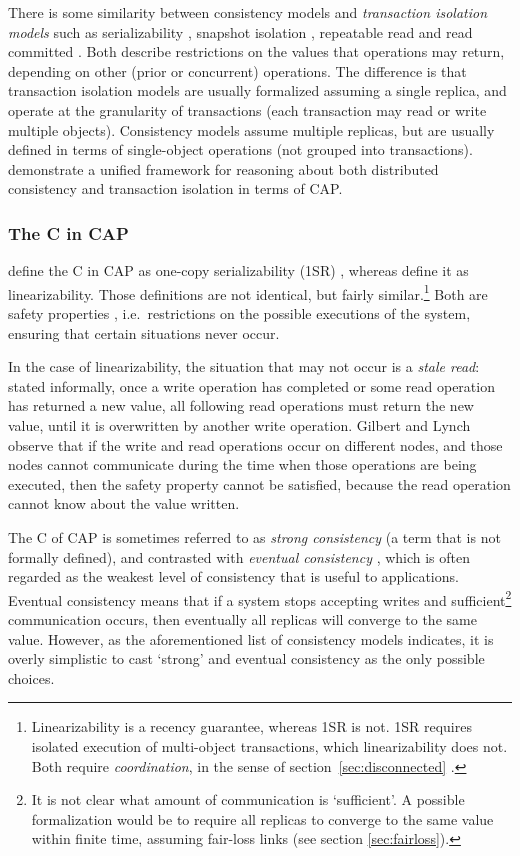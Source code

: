 \documentclass[fleqn,12pt,lineno]{wlpeerj} %
\begin{document}
There is some similarity between consistency models and \emph{transaction isolation models} such as
serializability \citep{Bernstein1987va}, snapshot isolation \citep{Berenson1995kj}, repeatable read
and read committed \citep{Adya1999tx,Gray1976us}. Both describe restrictions on the values that
operations may return, depending on other (prior or concurrent) operations. The difference is that
transaction isolation models are usually formalized assuming a single replica, and operate at the
granularity of transactions (each transaction may read or write multiple objects). Consistency
models assume multiple replicas, but are usually defined in terms of single-object operations (not
grouped into transactions). \citet{Bailis2014vc} demonstrate a unified framework for
reasoning about both distributed consistency and transaction isolation in terms of CAP.


\subsubsection{The C in CAP}\label{sec:c-in-cap}

\citet{Fox1999bs} define the C in CAP as one-copy serializability (1SR) \citep{Bernstein1987va},
whereas \citet{Gilbert2002il} define it as linearizability. Those definitions are not identical,
but fairly similar.\footnote{Linearizability
is a recency guarantee, whereas 1SR is not. 1SR requires isolated execution of multi-object
transactions, which linearizability does not. Both require \emph{coordination}, in the sense of
section~\ref{sec:disconnected} \citep{Bailis2014vc}.} Both are safety properties \citep{Alpern1985dg},
i.e.\ restrictions on the possible executions of the system, ensuring that certain situations never
occur.

In the case of linearizability, the situation that may not occur is a \emph{stale read}: stated
informally, once a write operation has completed or some read operation has returned a new value,
all following read operations must return the new value, until it is overwritten by another write
operation. Gilbert and Lynch observe that if the write and read operations occur on different nodes,
and those nodes cannot communicate during the time when those operations are being executed, then
the safety property cannot be satisfied, because the read operation cannot know about the value
written.

The C of CAP is sometimes referred to as \emph{strong consistency} (a term that is not formally
defined), and contrasted with \emph{eventual consistency} \citep{Terry1994fp,Vogels2008ey,Bailis2013jc},
which is often regarded as the weakest level of consistency that is useful to applications. Eventual
consistency means that if a system stops accepting writes and sufficient\footnote{It is not clear
what amount of communication is `sufficient'. A possible formalization would be to require all
replicas to converge to the same value within finite time, assuming fair-loss links (see section
\ref{sec:fairloss}).} communication occurs, then eventually all replicas will converge to the same
value. However, as the aforementioned list of consistency models indicates, it is overly simplistic
to cast `strong' and eventual consistency as the only possible choices.
\end{document}

